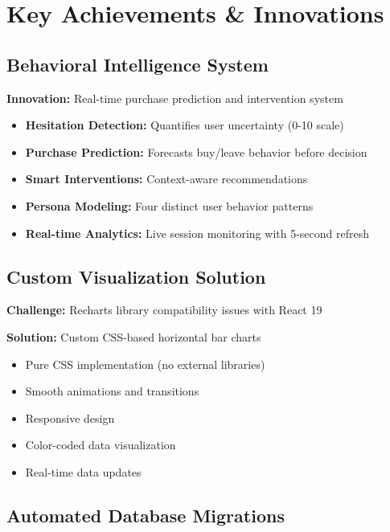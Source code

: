 \documentclass[12pt,a4paper]{article}
\begin{document}
\newpage

\section{Key Achievements \& Innovations}


\subsection{Behavioral Intelligence System}

\textbf{Innovation:} Real-time purchase prediction and intervention system

\begin{itemize}[leftmargin=*]
    \item \textbf{Hesitation Detection:} Quantifies user uncertainty (0-10 scale)
    \item \textbf{Purchase Prediction:} Forecasts buy/leave behavior before decision
    \item \textbf{Smart Interventions:} Context-aware recommendations
    \item \textbf{Persona Modeling:} Four distinct user behavior patterns
    \item \textbf{Real-time Analytics:} Live session monitoring with 5-second refresh
\end{itemize}

\subsection{Custom Visualization Solution}

\textbf{Challenge:} Recharts library compatibility issues with React 19

\textbf{Solution:} Custom CSS-based horizontal bar charts

\begin{itemize}[leftmargin=*]
    \item Pure CSS implementation (no external libraries)
    \item Smooth animations and transitions
    \item Responsive design
    \item Color-coded data visualization
    \item Real-time data updates
\end{itemize}

\subsection{Automated Database Migrations}
\end{document}
